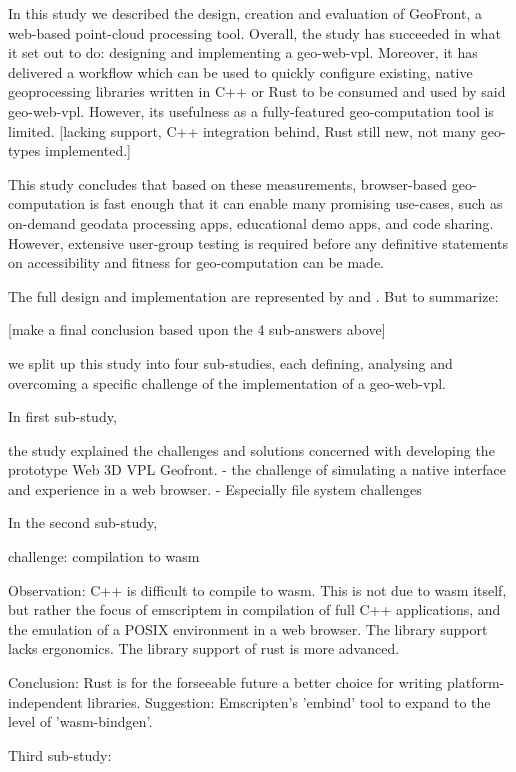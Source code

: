 In this study we described the design, creation and evaluation of GeoFront, a web-based point-cloud processing tool.
Overall, the study has succeeded in what it set out to do: designing and implementing a geo-web-vpl. 
Moreover, it has delivered a workflow which can be used to quickly configure existing, native geoprocessing libraries written in C++ or Rust to be consumed and used by said geo-web-vpl.  
However, its usefulness as a fully-featured geo-computation tool is limited.
[lacking support, C++ integration behind, Rust still new, not many geo-types implemented.]

This study concludes that based on these measurements, browser-based geo-computation  is fast enough that it can enable 
many promising use-cases, such as on-demand geodata processing apps, educational demo apps, and code sharing. 
However, extensive user-group testing is required before any definitive statements on accessibility and fitness for geo-computation can be made.  

The full design and implementation are represented by  and . 
But to summarize:

[make a final conclusion based upon the 4 sub-answers above]

we split up this study into four sub-studies, each defining, analysing and overcoming a specific challenge of the implementation of a \ac{geo-web-vpl}.

In first sub-study, 

the study explained the challenges and solutions concerned with developing the prototype Web 3D VPL Geofront.
- the challenge of simulating a native interface and experience in a web browser. 
- Especially file system challenges 

In the second sub-study,

challenge: 
compilation to wasm

Observation: 
C++ is difficult to compile to wasm.
This is not due to wasm itself, but rather the focus of emscriptem in compilation of full C++ applications, and the emulation of a POSIX environment in a web browser. 
The library support lacks ergonomics.
The library support of rust is more advanced.

Conclusion: 
Rust is for the forseeable future a better choice for writing platform-independent libraries. 
Suggestion: Emscripten's 'embind' tool to expand to the level of 'wasm-bindgen'.

Third sub-study: 

